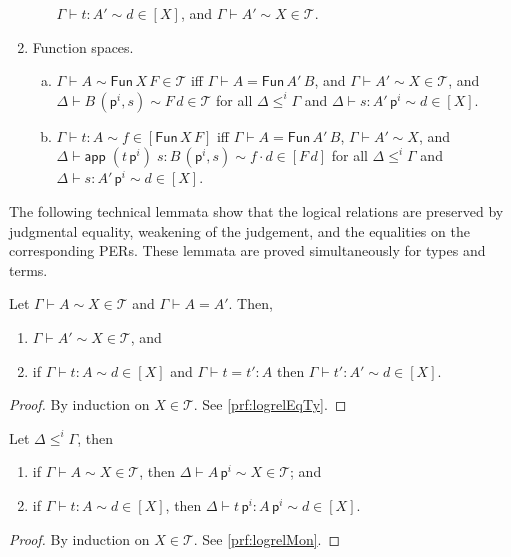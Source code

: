 \documentclass{LMCS}
\theoremstyle{plain}\newtheorem{satz}[thm]{Satz}
\newcommand{\LONGVERSION}[1]{#1}
\newcommand{\exsubs}[2]{( #1, #2)}
\newcommand{\subsTm}[2]{#1\,#2}
\newcommand{\subsTy}[2]{#1\,#2}
\newcommand{\F}[2]{\mathsf{Fun}\,#1\,#2}
\newcommand{\p}{\mathsf{p}}
\newcommand{\appTm}[2]{\mathsf{app}\;#1\;#2} \newcommand{\singTm}[2]{\{#1\}_{#2}}
\newcommand{\dtype}[2]{#1\vdash#2}
\newcommand{\dterm}[3]{#1\vdash#3:#2}
\newcommand{\deqtype}[3]{#1\vdash#2=#3}
\newcommand{\deqterm}[4]{#1\vdash#3=#4:#2}
\newcommand{\lift}[2]{\subsTm{#2}{\p^{#1}}}
\newcommand{\perT}{\mathcal{T}}
\newcommand{\rel}{\sim}
\newcommand{\iPi}[2]{\mathsf{Fun}\,#1\,#2}
\newcommand{\LONGVERSION}[1]{}
\begin{document}
\begin{defi}
\begin{enumerate}[(1)]
\begin{enumerate}[(a)]
      $\dterm{\Gamma}{A'}{t}\rel d\in [X]$, and
      $\dtype{\Gamma}{A'}\rel X\in\perT$.
    \end{enumerate}
  \item Function spaces.
    \begin{enumerate}[(a)]
    \item $\dtype{\Gamma}{A}\rel \iPi{X}{F} \in \perT$ iff
      $\deqtype{\Gamma}{A}{\F{A'}{B}}$, and $\dtype{\Gamma}{A'}\rel
      X\in \perT$, and
      $\dtype{\Delta}{\subsTy{B}{\exsubs{\p^i}{s}}}\rel F\,d\in \perT$
      for all $\Delta\leqslant^i\Gamma$ and
      $\dterm{\Delta}{\lift{i}{A'}}{s}\rel d\in [X]$.
    \item $\dterm{\Gamma}{A}{t}\rel f\in [\iPi{X}{F}]$ iff
      $\deqtype{\Gamma}{A}{\F{A'}{B}}$, $\dtype{\Gamma}{A'}\rel X$,
      and $\dterm{\Delta}{\subsTy{B}{\exsubs{\p^i}{s}}}
      {\appTm{(\lift{i}{t})}{s}}\rel f\cdot d \in [F\,d]$ for all
      $\Delta\leqslant^i\Gamma$ and
      $\dterm{\Delta}{\lift{i}{A'}}{s}\rel d\in [X]$.
    \end{enumerate}
  \end{enumerate}
\end{defi}\medskip


\noindent The following technical lemmata show that the logical relations are
preserved by judgmental equality, weakening of the judgement, and the
equalities on the corresponding PERs.   These lemmata are proved
simultaneously for types and terms.


\begin{lem}
  \label{lem:logrelEqTy} Let $\dtype{\Gamma}{A}\rel X\in \perT$ 
  and $\deqtype{\Gamma}{A}{A'}$.  Then,
  \begin{enumerate}[\em(a)]
  \item $\dtype{\Gamma}{A'}\rel X\in\perT$, and
  \item if $\dterm{\Gamma}{A}{t}\rel d\in [X]$ and $\deqterm{\Gamma}{A}{t}{t'}$ 
  then $\dterm{\Gamma}{A'}{t'}\rel d\in[X]$.
  \end{enumerate}
\end{lem}
\LONGVERSION{
\begin{proof}By induction on $X\in \perT$. See \ref{prf:logrelEqTy}.
\end{proof}
}

\begin{lem}[Monotonicity]
  \label{lem:logrelMon}
  Let $\Delta\leqslant^i\Gamma$, then
  \begin{enumerate}[\em(a)]
  \item if $\dtype{\Gamma}{A}\rel X\in\perT$, then
    $\dtype{\Delta}{\lift{i}{A}}\rel X\in\perT$; and
  \item if $\dterm{\Gamma}{A}{t}\rel d\in [X]$, then
    $\dterm{\Delta}{\lift{i}{A}}{\lift{i}{t}}\rel d\in[X]$.
  \end{enumerate}
\end{lem}
\LONGVERSION{
  \begin{proof}By induction on $X \in \perT$. See \ref{prf:logrelMon}.
  \end{proof}
}
\end{document}
